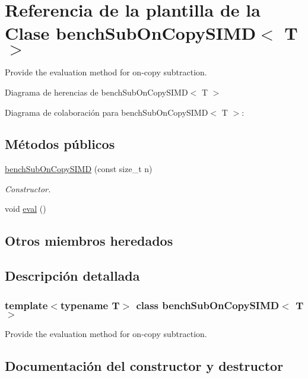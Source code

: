 \hypertarget{classbenchSubOnCopySIMD}{}\section{Referencia de la plantilla de la Clase bench\+Sub\+On\+Copy\+S\+I\+MD$<$ T $>$}
\label{classbenchSubOnCopySIMD}


Provide the evaluation method for on-\/copy subtraction.  




Diagrama de herencias de bench\+Sub\+On\+Copy\+S\+I\+MD$<$ T $>$


Diagrama de colaboración para bench\+Sub\+On\+Copy\+S\+I\+MD$<$ T $>$\+:
\subsection*{Métodos públicos}
\begin{DoxyCompactItemize}
\item 
\hyperlink{classbenchSubOnCopySIMD_a76cb1f0a3ec9bb34ed764f741f8f854c}{bench\+Sub\+On\+Copy\+S\+I\+MD} (const size\+\_\+t n)
\begin{DoxyCompactList}\small\item\em Constructor. \end{DoxyCompactList}\item 
void \hyperlink{classbenchSubOnCopySIMD_ac0e553f6d6810a87cd5796750ba1ea83}{eval} ()
\end{DoxyCompactItemize}
\subsection*{Otros miembros heredados}


\subsection{Descripción detallada}
\subsubsection*{template$<$typename T$>$\newline
class bench\+Sub\+On\+Copy\+S\+I\+M\+D$<$ T $>$}

Provide the evaluation method for on-\/copy subtraction. 

\subsection{Documentación del constructor y destructor}
\mbox{\label{classbenchSubOnCopySIMD_a76cb1f0a3ec9bb34ed764f741f8f854c}} 

